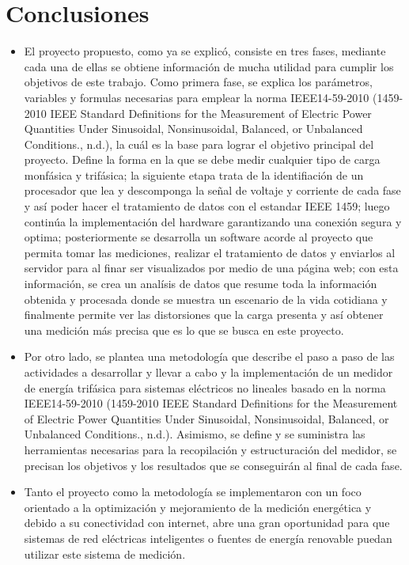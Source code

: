 {\clearpage}
\chapter{ Conclusiones}

\begin{itemize}
    \itemsep0em
    \item El proyecto propuesto, como ya se explicó, consiste en tres fases, mediante cada una de ellas se obtiene información de mucha utilidad para cumplir los objetivos de este trabajo. Como primera fase, se explica los parámetros, variables y formulas necesarias para emplear la norma IEEE14-59-2010 (1459-2010 IEEE Standard Definitions for the Measurement of Electric Power Quantities Under Sinusoidal, Nonsinusoidal, Balanced, or Unbalanced Conditions., n.d.), la cuál es la base para lograr el objetivo principal del proyecto. Define la forma en la que se debe medir cualquier tipo de carga monfásica y trifásica; la siguiente etapa trata de la identifiación de un procesador que lea y descomponga la señal de voltaje y corriente de cada fase y así poder hacer el tratamiento de datos con el estandar IEEE 1459; luego continúa la implementación del hardware garantizando una conexión segura y optima; posteriormente se desarrolla un software acorde al proyecto que permita tomar las mediciones, realizar el tratamiento de datos y enviarlos al servidor para al finar ser visualizados por medio de una página web; con esta información, se crea un analísis de datos que resume toda la información obtenida y procesada donde se muestra un escenario de la vida cotidiana y finalmente permite ver las distorsiones que la carga presenta y así obtener una medición más precisa que es lo que se busca en este proyecto.
    \item Por otro lado, se plantea una metodología que describe el paso a paso de las actividades a desarrollar y llevar a cabo y la implementación de un medidor de energía trifásica para sistemas eléctricos no lineales basado en la norma IEEE14-59-2010 (1459-2010 IEEE Standard Definitions for the Measurement of Electric Power Quantities Under Sinusoidal, Nonsinusoidal, Balanced, or Unbalanced Conditions., n.d.). Asimismo, se define y se suministra las herramientas necesarias para la recopilación y estructuración del medidor, se precisan los objetivos y los resultados que se conseguirán al final de cada fase.
    \item Tanto el proyecto como la metodología se implementaron con un foco orientado a la optimización y mejoramiento de la medición energética y debido a su conectividad con internet, abre una gran oportunidad para que sistemas de red eléctricas inteligentes o fuentes de energía renovable puedan utilizar este sistema de medición.

\end{itemize}
